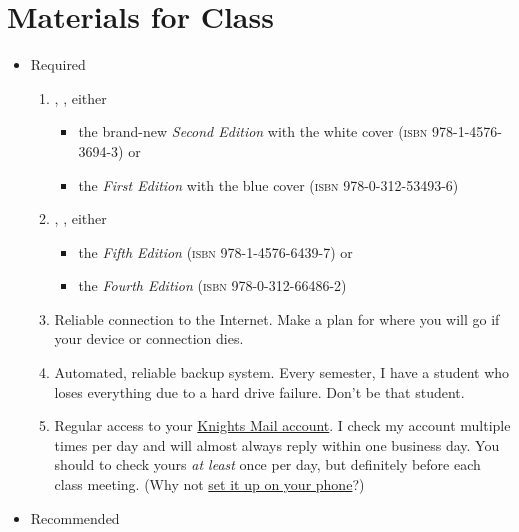 \documentclass[11pt,oneside]{amsart}	%
\begin{document}
\clearpage
\section{Materials for Class}
\begin{itemize}
	\item Required
		\begin{enumerate}
\item \citeauthor{downs:2010aa}, , either
\begin{itemize}
	\item the brand-new \emph{Second Edition} with the white cover (\textsc{isbn} 978-1-4576-3694-3) or
	\item the \emph{First Edition} with the blue cover (\textsc{isbn} 978-0-312-53493-6)
\end{itemize}
		\item \citeauthor{lunsford:2010aa}, , either
		\begin{itemize}
			\item the \emph{Fifth Edition} (\textsc{isbn} 978-1-4576-6439-7) or
			\item the \emph{Fourth Edition} (\textsc{isbn} 978-0-312-66486-2)%
		\end{itemize}%
		\item Reliable connection to the Internet. Make a plan for where you will go if your device or connection dies.
		\item Automated, reliable backup system. Every semester, I have a student who loses everything due to a hard drive failure. Don't be that student.
		\item Regular access to your \href{http://www.outlook.com/knights.ucf.edu}{Knights Mail account}. I check my account multiple times per day and will almost always reply within one business day. You should to check yours \emph{at least} once per day, but definitely before each class meeting. (Why not \href{http://www.students.graduate.ucf.edu/knights_email_for_mobile/}{set it up on your phone}?)
	\end{enumerate}
	\item Recommended
	\begin{enumerate}

\end{enumerate}
\end{itemize}
\end{document}
